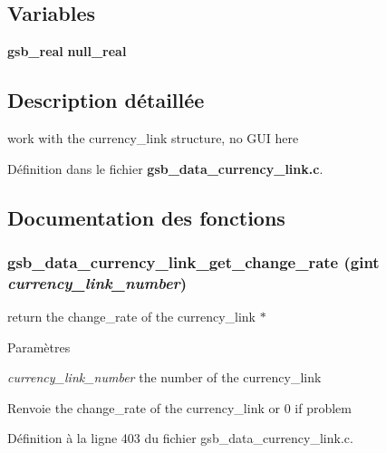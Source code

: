 \subsection*{Variables}
\begin{DoxyCompactItemize}
\item 
{\bf gsb\_\-real} {\bf null\_\-real}
\end{DoxyCompactItemize}


\subsection{Description détaillée}
work with the currency\_\-link structure, no GUI here 

Définition dans le fichier {\bf gsb\_\-data\_\-currency\_\-link.c}.



\subsection{Documentation des fonctions}
\subsubsection[{gsb\_\-data\_\-currency\_\-link\_\-get\_\-change\_\-rate}]{ gsb\_\-data\_\-currency\_\-link\_\-get\_\-change\_\-rate (gint {\em currency\_\-link\_\-number})}\label{gsb__data__currency__link_8c_aa18864d68d7555d3b39e14ef87beeb7d}
return the change\_\-rate of the currency\_\-link $\ast$ 
\begin{DoxyParams}{Paramètres}
\item[{\em currency\_\-link\_\-number}]the number of the currency\_\-link\end{DoxyParams}
\begin{DoxyReturn}{Renvoie}
the change\_\-rate of the currency\_\-link or 0 if problem 
\end{DoxyReturn}


Définition à la ligne 403 du fichier gsb\_\-data\_\-currency\_\-link.c.

